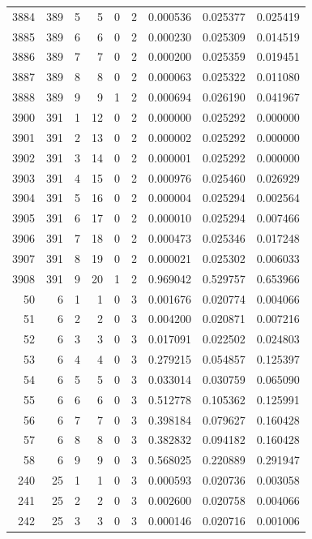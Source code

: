 \begin{longtable}{rrrrrrrrr}
3884 & 389 & 5 & 5 & 0 & 2 & 0.000536 & 0.025377 & 0.025419 \\
3885 & 389 & 6 & 6 & 0 & 2 & 0.000230 & 0.025309 & 0.014519 \\
3886 & 389 & 7 & 7 & 0 & 2 & 0.000200 & 0.025359 & 0.019451 \\
3887 & 389 & 8 & 8 & 0 & 2 & 0.000063 & 0.025322 & 0.011080 \\
3888 & 389 & 9 & 9 & 1 & 2 & 0.000694 & 0.026190 & 0.041967 \\
3900 & 391 & 1 & 12 & 0 & 2 & 0.000000 & 0.025292 & 0.000000 \\
3901 & 391 & 2 & 13 & 0 & 2 & 0.000002 & 0.025292 & 0.000000 \\
3902 & 391 & 3 & 14 & 0 & 2 & 0.000001 & 0.025292 & 0.000000 \\
3903 & 391 & 4 & 15 & 0 & 2 & 0.000976 & 0.025460 & 0.026929 \\
3904 & 391 & 5 & 16 & 0 & 2 & 0.000004 & 0.025294 & 0.002564 \\
3905 & 391 & 6 & 17 & 0 & 2 & 0.000010 & 0.025294 & 0.007466 \\
3906 & 391 & 7 & 18 & 0 & 2 & 0.000473 & 0.025346 & 0.017248 \\
3907 & 391 & 8 & 19 & 0 & 2 & 0.000021 & 0.025302 & 0.006033 \\
3908 & 391 & 9 & 20 & 1 & 2 & 0.969042 & 0.529757 & 0.653966 \\
50 & 6 & 1 & 1 & 0 & 3 & 0.001676 & 0.020774 & 0.004066 \\
51 & 6 & 2 & 2 & 0 & 3 & 0.004200 & 0.020871 & 0.007216 \\
52 & 6 & 3 & 3 & 0 & 3 & 0.017091 & 0.022502 & 0.024803 \\
53 & 6 & 4 & 4 & 0 & 3 & 0.279215 & 0.054857 & 0.125397 \\
54 & 6 & 5 & 5 & 0 & 3 & 0.033014 & 0.030759 & 0.065090 \\
55 & 6 & 6 & 6 & 0 & 3 & 0.512778 & 0.105362 & 0.125991 \\
56 & 6 & 7 & 7 & 0 & 3 & 0.398184 & 0.079627 & 0.160428 \\
57 & 6 & 8 & 8 & 0 & 3 & 0.382832 & 0.094182 & 0.160428 \\
58 & 6 & 9 & 9 & 0 & 3 & 0.568025 & 0.220889 & 0.291947 \\
240 & 25 & 1 & 1 & 0 & 3 & 0.000593 & 0.020736 & 0.003058 \\
241 & 25 & 2 & 2 & 0 & 3 & 0.002600 & 0.020758 & 0.004066 \\
242 & 25 & 3 & 3 & 0 & 3 & 0.000146 & 0.020716 & 0.001006 \\

\end{longtable}
